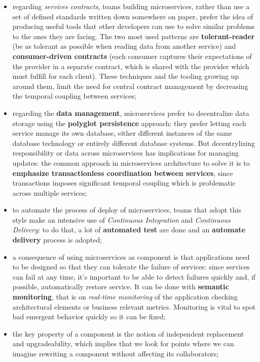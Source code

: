 \documentclass[oneside]{article}
\begin{document}
\begin{itemize}
    \item regarding \textit{services contracts}, teams building microservices, rather than use a set of defined standards written down somewhere on paper, prefer the idea of producing useful tools that other developers can use to solve similar problems to the ones they are facing. The two most used patterns are \textbf{tolerant-reader} (be as tolerant as possible when reading data from another service) and \textbf{consumer-driven contracts} (each consumer captures their expectations of the provider in a separate contract, which is shared with the provider which must fulfill for each client). These techniques and the tooling growing up around them, limit the need for central contract management by decreasing the temporal coupling between services;
    
    \item regarding the \textbf{data management}, microservices prefer to decentralize data storage using the \textbf{polyglot persistence} approach: they prefer letting each service manage its own database, either different instances of the same database technology or entirely different database systems. But decentrylizing responsibility or data across microservices has implications for managing updates: the common approach in microservices architecture to solve it is to \textbf{emphasize transactionless coordination between services}, since transactions imposes significant temporal coupling which is problematic across multiple services;
    
    \item to automate the process of deploy of microservices, teams that adopt this style make an intensive use of \textit{Continuous Integration} and \textit{Continuous Delivery}: to do that, a lot of \textbf{automated test} are done and an \textbf{automate delivery} process is adopted;
    
    \item a consequence of using microservices as component is that applications need to be designed so that they can tolerate the failure of services: since services can fail at any time, it's important to be able to detect failures quickly and, if possible, automatically restore service. It can be done with \textbf{semantic monitoring}, that is on \textit{real-time monitoring} of the application checking architectural elements or business relevant metrics. Monitoring is vital to spot bad emergent behavior quickly so it can be fixed;
    
    \item the key property of a component is the notion of independent replacement and upgradeability, which implies that we look for points where we can imagine rewriting a component without affecting its collaborators;
    

\end{itemize}
\end{document}

